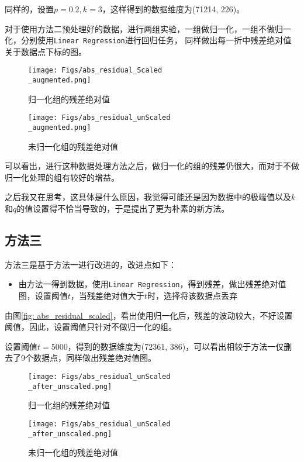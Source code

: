 \documentclass[12pt, a4paper, oneside]{ctexart}
\begin{document}
同样的，设置$p=0.2, k=3$，这样得到的数据维度为(71214, 226)。

对于使用方法二预处理好的数据，进行两组实验，一组做归一化，一组不做归一化，分别使用\texttt{Linear Regression}进行回归任务，
同样做出每一折中残差绝对值关于数据点下标的图。

\begin{figure}[H]
    \centering
    \texttt{[image: Figs/abs\_residual\_Scaled\\\_augmented.png]}
    \caption{归一化组的残差绝对值}
\end{figure}

\begin{figure}[H]
    \centering
    \texttt{[image: Figs/abs\_residual\_unScaled\\\_augmented.png]}
    \caption{未归一化组的残差绝对值}
\end{figure}
可以看出，进行这种数据处理方法之后，做归一化的组的残差仍很大，而对于不做归一化处理的组有较好的增益。

之后我又在思考，这具体是什么原因，我觉得可能还是因为数据中的极端值以及$k$和$q$的值设置得不恰当导致的，于是提出了更为朴素的新方法。
\subsection{方法三}

方法三是基于方法一进行改进的，改进点如下：
\begin{itemize}
    \item 由方法一得到数据，使用\texttt{Linear Regression}，得到残差，做出残差绝对值图，设置阈值$t$，当残差绝对值大于$t$时，选择将该数据点丢弃
\end{itemize}

由图\ref{fig: abs_residual_scaled}，看出使用归一化后，残差的波动较大，不好设置阈值，因此，设置阈值只针对不做归一化的组。

设置阈值$t=5000$，得到的数据维度为(72361, 386)，可以看出相较于方法一仅删去了9个数据点，同样做出残差绝对值图。

\begin{figure}[H]
    \centering
    \texttt{[image: Figs/abs\_residual\_unScaled\\\_after\_unscaled.png]}
    \caption{归一化组的残差绝对值}
\end{figure}

\begin{figure}[H]
    \centering
    \texttt{[image: Figs/abs\_residual\_unScaled\\\_after\_unscaled.png]}
    \caption{未归一化组的残差绝对值}
\end{figure}
\end{document}
